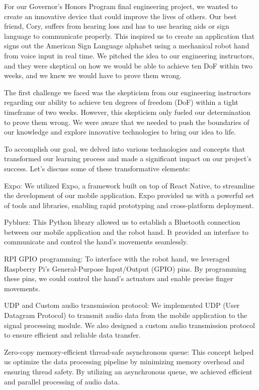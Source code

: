 
For our Governor's Honors Program final engineering project, we wanted to create an innovative device that could improve the lives of others. Our best friend, Cory, suffers from hearing loss and has to use hearing aids or sign language to communicate properly. This inspired us to create an application that signs out the American Sign Language alphabet using a mechanical robot hand from voice input in real time. We pitched the idea to our engineering instructors, and they were skeptical on how we would be able to achieve ten DoF within two weeks, and we knew we would have to prove them wrong. 

The first challenge we faced was the skepticism from our engineering instructors regarding our ability to achieve ten degrees of freedom (DoF) within a tight timeframe of two weeks. However, this skepticism only fueled our determination to prove them wrong. We were aware that we needed to push the boundaries of our knowledge and explore innovative technologies to bring our idea to life.

To accomplish our goal, we delved into various technologies and concepts that transformed our learning process and made a significant impact on our project's success. Let's discuss some of these transformative elements:

Expo: We utilized Expo, a framework built on top of React Native, to streamline the development of our mobile application. Expo provided us with a powerful set of tools and libraries, enabling rapid prototyping and cross-platform deployment.

Pybluez: This Python library allowed us to establish a Bluetooth connection between our mobile application and the robot hand. It provided an interface to communicate and control the hand's movements seamlessly.

RPI GPIO programming: To interface with the robot hand, we leveraged Raspberry Pi's General-Purpose Input/Output (GPIO) pins. By programming these pins, we could control the hand's actuators and enable precise finger movements.

UDP and Custom audio transmission protocol: We implemented UDP (User Datagram Protocol) to transmit audio data from the mobile application to the signal processing module. We also designed a custom audio transmission protocol to ensure efficient and reliable data transfer.

Zero-copy memory-efficient thread-safe asynchronous queue: This concept helped us optimize the data processing pipeline by minimizing memory overhead and ensuring thread safety. By utilizing an asynchronous queue, we achieved efficient and parallel processing of audio data.

